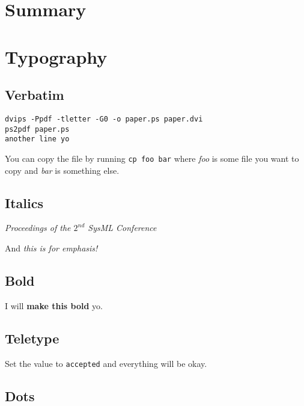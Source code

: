 \documentclass{article}
\begin{document}
\section{Summary}



\section{Typography}


\subsection{Verbatim}

{\footnotesize
\begin{verbatim}
dvips -Ppdf -tletter -G0 -o paper.ps paper.dvi
ps2pdf paper.ps
another line yo
\end{verbatim}}

You can copy the file by running \verb|cp foo bar| where \textit{foo}
is some file you want to copy and \textit{bar} is something else.

\subsection{Italics}

\textit{Proceedings of the $\mathit{2}^{nd}$ SysML Conference}

And \emph{this is for emphasis!}

\subsection{Bold}

I will \textbf{make this bold} yo.

\subsection{Teletype}

Set the value to \texttt{accepted} and everything will be okay.

\subsection{Dots}
\end{document}
